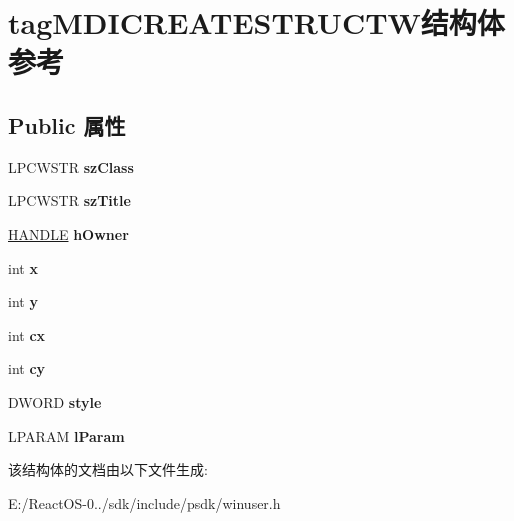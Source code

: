 \hypertarget{structtag_m_d_i_c_r_e_a_t_e_s_t_r_u_c_t_w}{}\section{tag\+M\+D\+I\+C\+R\+E\+A\+T\+E\+S\+T\+R\+U\+C\+T\+W结构体 参考}
\label{structtag_m_d_i_c_r_e_a_t_e_s_t_r_u_c_t_w}
\subsection*{Public 属性}
\begin{DoxyCompactItemize}
\item 
\mbox{\label{structtag_m_d_i_c_r_e_a_t_e_s_t_r_u_c_t_w_a39078555f5d12cc3c571616928617f43}} 
L\+P\+C\+W\+S\+TR {\bfseries sz\+Class}
\item 
\mbox{\label{structtag_m_d_i_c_r_e_a_t_e_s_t_r_u_c_t_w_aa24bdda3a8ce4c0167756c120cb04b2e}} 
L\+P\+C\+W\+S\+TR {\bfseries sz\+Title}
\item 
\mbox{\label{structtag_m_d_i_c_r_e_a_t_e_s_t_r_u_c_t_w_a1e235a9a4799aa05e51928716437ee06}} 
\hyperlink{interfacevoid}{H\+A\+N\+D\+LE} {\bfseries h\+Owner}
\item 
\mbox{\label{structtag_m_d_i_c_r_e_a_t_e_s_t_r_u_c_t_w_ad4e8e542187da0a258a57a546187320c}} 
int {\bfseries x}
\item 
\mbox{\label{structtag_m_d_i_c_r_e_a_t_e_s_t_r_u_c_t_w_a8e8b30621494404959200f80c9ba588f}} 
int {\bfseries y}
\item 
\mbox{\label{structtag_m_d_i_c_r_e_a_t_e_s_t_r_u_c_t_w_a72306cfde67a25469b5f961187920332}} 
int {\bfseries cx}
\item 
\mbox{\label{structtag_m_d_i_c_r_e_a_t_e_s_t_r_u_c_t_w_a6af04e6d882eff3fc16a231068d2fabb}} 
int {\bfseries cy}
\item 
\mbox{\label{structtag_m_d_i_c_r_e_a_t_e_s_t_r_u_c_t_w_ae8bbf9d509d798b7b5c5eb1d66f62c92}} 
D\+W\+O\+RD {\bfseries style}
\item 
\mbox{\label{structtag_m_d_i_c_r_e_a_t_e_s_t_r_u_c_t_w_a29fc67c1e757b327a4c2745950281b32}} 
L\+P\+A\+R\+AM {\bfseries l\+Param}
\end{DoxyCompactItemize}


该结构体的文档由以下文件生成\+:\begin{DoxyCompactItemize}
\item 
E\+:/\+React\+O\+S-\/0../sdk/include/psdk/winuser.\+h\end{DoxyCompactItemize}
